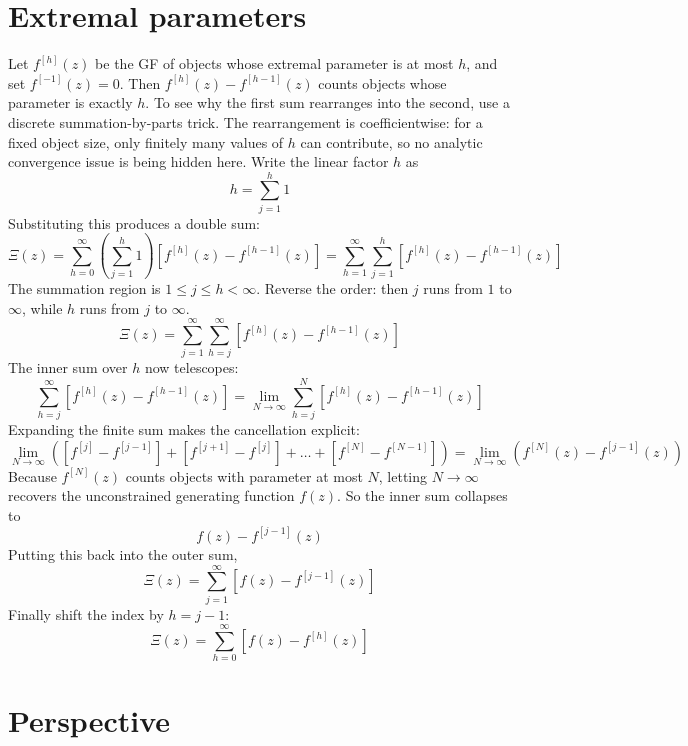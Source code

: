 \section{Extremal parameters}
Let $f^{[h]}(z)$ be the GF of objects whose extremal parameter is at most $h$, and set
$f^{[-1]}(z)=0$. Then $f^{[h]}(z)-f^{[h-1]}(z)$ counts objects whose parameter is exactly $h$.
To see why the first sum rearranges into the second, use a discrete summation-by-parts trick.
The rearrangement is coefficientwise: for a fixed object size, only finitely many values of $h$
can contribute, so no analytic convergence issue is being hidden here.
Write the linear factor $h$ as
\begin{equation*}
    h = \sum_{j = 1}^{h}1
\end{equation*}
Substituting this produces a double sum:
\begin{equation*}
    \Xi(z) = \sum_{h = 0}^{\infty} \left(\sum_{j = 1}^{h}1\right)\left[f^{[h]}(z) - f^{[h-1]}(z)\right]
        = \sum_{h = 1}^{\infty} \sum_{j = 1}^{h} \left[f^{[h]}(z) - f^{[h - 1]}(z)\right]
\end{equation*}
The summation region is $1 \leq j \leq h < \infty$. Reverse the order: then $j$ runs from $1$ to $\infty$, while $h$ runs from $j$ to $\infty$.
\begin{equation*}
    \Xi(z) = \sum_{j = 1}^{\infty} \sum_{h = j}^{\infty} \left[f^{[h]}(z) - f^{[h - 1]}(z)\right]
\end{equation*}
The inner sum over $h$ now telescopes:
\begin{equation*}
    \sum_{h = j}^{\infty} \left[f^{[h]}(z) - f^{[h - 1]}(z)\right] = \lim_{N \to \infty} \sum_{h = j}^{N} \left[ f^{[h]}(z) - f^{[h - 1]}(z)\right]
\end{equation*}
Expanding the finite sum makes the cancellation explicit:
\begin{equation*}
    \lim_{N \to \infty} \left(\left[f^{[j]} - f^{[j - 1]}\right] + \left[f^{[j + 1]} - f^{[j]}\right] + \dots + \left[f^{[N]} - f^{[N - 1]}\right]\right)
        = \lim_{N \to \infty} \left(f^{[N]}(z) - f^{[j - 1]}(z)\right)
\end{equation*}
Because $f^{[N]}(z)$ counts objects with parameter at most $N$, letting $N \to \infty$ recovers the unconstrained generating function $f(z)$.
So the inner sum collapses to
\begin{equation*}
    f(z) - f^{[j - 1]}(z)
\end{equation*}
Putting this back into the outer sum,
\begin{equation*}
    \Xi(z) = \sum_{j = 1}^{\infty} \left[f(z) - f^{[j - 1]}(z)\right]
\end{equation*}
Finally shift the index by $h = j - 1$:
\begin{equation*}
    \Xi(z) = \sum_{h = 0}^{\infty} \left[f(z) - f^{[h]}(z)\right]
\end{equation*}

\section{Perspective}
